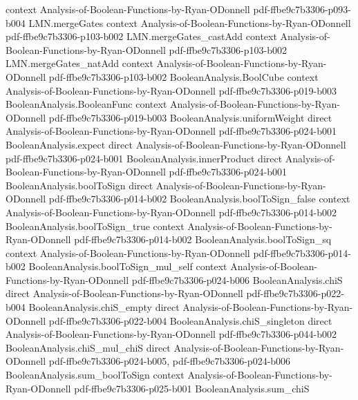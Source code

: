 \begin{lemma}
  {context}
  {Analysis-of-Boolean-Functions-by-Ryan-ODonnell}
  {pdf-ffbe9c7b3306-p093-b004}
\proofstep
  {LMN.mergeGates}
  {context}
  {Analysis-of-Boolean-Functions-by-Ryan-ODonnell}
  {pdf-ffbe9c7b3306-p103-b002}
\proofstep
  {LMN.mergeGates_castAdd}
  {context}
  {Analysis-of-Boolean-Functions-by-Ryan-ODonnell}
  {pdf-ffbe9c7b3306-p103-b002}
\proofstep
  {LMN.mergeGates_natAdd}
  {context}
  {Analysis-of-Boolean-Functions-by-Ryan-ODonnell}
  {pdf-ffbe9c7b3306-p103-b002}
\proofstep
  {BooleanAnalysis.BoolCube}
  {context}
  {Analysis-of-Boolean-Functions-by-Ryan-ODonnell}
  {pdf-ffbe9c7b3306-p019-b003}
\proofstep
  {BooleanAnalysis.BooleanFunc}
  {context}
  {Analysis-of-Boolean-Functions-by-Ryan-ODonnell}
  {pdf-ffbe9c7b3306-p019-b003}
\proofstep
  {BooleanAnalysis.uniformWeight}
  {direct}
  {Analysis-of-Boolean-Functions-by-Ryan-ODonnell}
  {pdf-ffbe9c7b3306-p024-b001}
\proofstep
  {BooleanAnalysis.expect}
  {direct}
  {Analysis-of-Boolean-Functions-by-Ryan-ODonnell}
  {pdf-ffbe9c7b3306-p024-b001}
\proofstep
  {BooleanAnalysis.innerProduct}
  {direct}
  {Analysis-of-Boolean-Functions-by-Ryan-ODonnell}
  {pdf-ffbe9c7b3306-p024-b001}
\proofstep
  {BooleanAnalysis.boolToSign}
  {direct}
  {Analysis-of-Boolean-Functions-by-Ryan-ODonnell}
  {pdf-ffbe9c7b3306-p014-b002}
\proofstep
  {BooleanAnalysis.boolToSign_false}
  {context}
  {Analysis-of-Boolean-Functions-by-Ryan-ODonnell}
  {pdf-ffbe9c7b3306-p014-b002}
\proofstep
  {BooleanAnalysis.boolToSign_true}
  {context}
  {Analysis-of-Boolean-Functions-by-Ryan-ODonnell}
  {pdf-ffbe9c7b3306-p014-b002}
\proofstep
  {BooleanAnalysis.boolToSign_sq}
  {context}
  {Analysis-of-Boolean-Functions-by-Ryan-ODonnell}
  {pdf-ffbe9c7b3306-p014-b002}
\proofstep
  {BooleanAnalysis.boolToSign_mul_self}
  {context}
  {Analysis-of-Boolean-Functions-by-Ryan-ODonnell}
  {pdf-ffbe9c7b3306-p024-b006}
\proofstep
  {BooleanAnalysis.chiS}
  {direct}
  {Analysis-of-Boolean-Functions-by-Ryan-ODonnell}
  {pdf-ffbe9c7b3306-p022-b004}
\proofstep
  {BooleanAnalysis.chiS_empty}
  {direct}
  {Analysis-of-Boolean-Functions-by-Ryan-ODonnell}
  {pdf-ffbe9c7b3306-p022-b004}
\proofstep
  {BooleanAnalysis.chiS_singleton}
  {direct}
  {Analysis-of-Boolean-Functions-by-Ryan-ODonnell}
  {pdf-ffbe9c7b3306-p044-b002}
\proofstep
  {BooleanAnalysis.chiS_mul_chiS}
  {direct}
  {Analysis-of-Boolean-Functions-by-Ryan-ODonnell}
  {pdf-ffbe9c7b3306-p024-b005,
    pdf-ffbe9c7b3306-p024-b006}
\proofstep
  {BooleanAnalysis.sum_boolToSign}
  {context}
  {Analysis-of-Boolean-Functions-by-Ryan-ODonnell}
  {pdf-ffbe9c7b3306-p025-b001}
\proofstep
  {BooleanAnalysis.sum_chiS}

\end{lemma}
